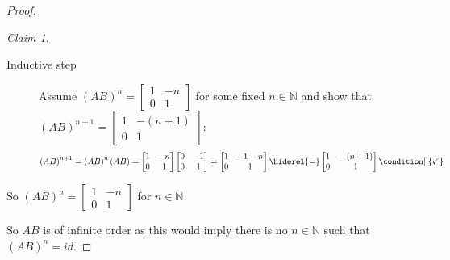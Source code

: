 \documentclass{article}
\theoremstyle{definition}
\theoremstyle{remark}
\newtheorem*{claim}{Claim}
\newcommand{\N}{\mathbb{N}}
\begin{document}
\begin{proof}
\begin{claim}
\begin{description}
				\item[Inductive step] Assume $\left(AB\right)^n=\left[\begin{smallmatrix}
					1 & -n \\ 
					0 & 1
				\end{smallmatrix} \right]$ for some fixed $n\in\N$ and show that $\left(AB\right)^{n+1}=\left[\begin{smallmatrix}
					1 & -\left(n+1\right) \\ 
					0 & 1
				\end{smallmatrix} \right]$:\\
				\begin{dmath*}
					\left(AB\right)^{n+1} = \left(AB\right)^n\left(AB\right) = \begin{bmatrix}
						1 & -n \\ 
						0 & 1
					\end{bmatrix} \begin{bmatrix}
						0 & -1 \\ 
						0 & 1
					\end{bmatrix} = \begin{bmatrix}
						1 & -1-n \\ 
						0 & 1
					\end{bmatrix} \hiderel{=} \begin{bmatrix}
						1 & -\left(n+1\right) \\ 
						0 & 1
					\end{bmatrix} \condition[]{\checkmark} 
				\end{dmath*}
			\end{description} So $\left(AB\right)^n=\left[\begin{smallmatrix}
				1 & -n \\ 
				0 & 1
			\end{smallmatrix} \right]$ for $n\in\N$.
		\end{claim}
		So $AB$ is of infinite order as this would imply there is no $n\in\N$ such that $\left(AB\right)^n=id$. 
	\end{proof}
	
\end{document}
